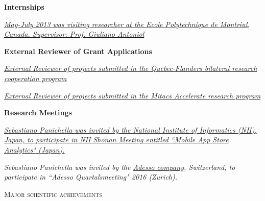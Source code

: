 \documentclass[12pt]{article}
\begin{document}
\textbf{Internships}
\begin{innerlist}
   \item \emph{
              \href{http://www.polymtl.ca/‎}
                   {May-July 2013 was visiting researcher at the Ecole Polytechnique de Montr\`{e}al, Canada. Supervisor: Prof. Giuliano Antoniol}}
\end{innerlist}


\textbf{External Reviewer of Grant Applications}
\begin{innerlist}
   \item \emph{
              \href{http://www.frqnt.gouv.qc.ca/accueil}
                   {External Reviewer of projects submitted in the Quebec-Flanders bilateral research cooperation program}}
\item \emph{
              \href{}
                   {External Reviewer of projects submitted in the Mitacs Accelerate research program}}
                   
\end{innerlist}


\textbf{Research Meetings}
\begin{innerlist}
   \item \emph{
              \href{http://www.nii.ac.jp/��}
                   {Sebastiano Panichella was invited by the \href{http://www.nii.ac.jp/}{National Institute of Informatics} (NII), Japan, to participate in \href{http://shonan.nii.ac.jp/shonan/}{NII Shonan Meeting entitled ``Mobile App Store Analytics"} (Japan).
}}

\item  \emph{Sebastiano Panichella was invited by the \href{http://www.adesso.de/de/}{Adesso company}, Switzerland, to participate in \textit{``Adesso Quartalsmeeting" 2016} (Zurich).}

\end{innerlist}
\vspace{8.5mm}

\textsc{Major scientific achievements}
\end{document}
